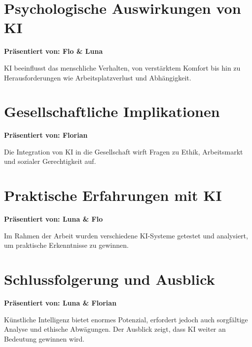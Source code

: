 \documentclass[a4paper,12pt]{article}
\begin{document}
\section{Psychologische Auswirkungen von KI}
\textbf{Präsentiert von: Flo \& Luna}

KI beeinflusst das menschliche Verhalten, von verstärktem Komfort bis hin zu Herausforderungen wie Arbeitsplatzverlust und Abhängigkeit.

\section{Gesellschaftliche Implikationen}
\textbf{Präsentiert von: Florian}


Die Integration von KI in die Gesellschaft wirft Fragen zu Ethik, Arbeitsmarkt und sozialer Gerechtigkeit auf.

\section{Praktische Erfahrungen mit KI}
\textbf{Präsentiert von: Luna \& Flo}

Im Rahmen der Arbeit wurden verschiedene KI-Systeme getestet und analysiert, um praktische Erkenntnisse zu gewinnen.

\section{Schlussfolgerung und Ausblick}
\textbf{Präsentiert von: Luna \& Florian}

Künstliche Intelligenz bietet enormes Potenzial, erfordert jedoch auch sorgfältige Analyse und ethische Abwägungen. Der Ausblick zeigt, dass KI weiter an Bedeutung gewinnen wird.

\newpage
\printbibliography
\end{document}
